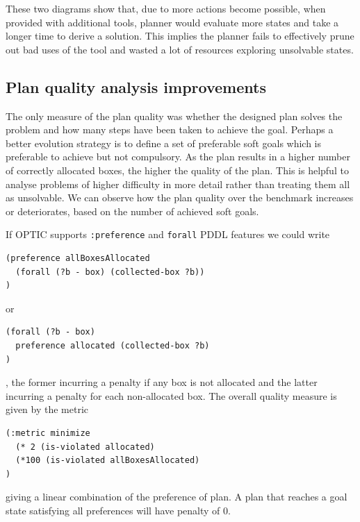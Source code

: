 \documentclass[letterpaper]{article} %
\begin{document}
These two diagrams show that, due to more actions become possible, 
when provided with additional tools, planner would evaluate more 
states and take a longer time to derive a solution. This implies 
the planner fails to effectively prune out bad uses of the tool and 
wasted a lot of resources exploring unsolvable states. 
\subsection{Plan quality analysis improvements}
The only measure of the plan quality was whether 
the designed plan solves the problem and how many 
steps have been taken to achieve the goal. Perhaps a better 
evolution strategy is to define a set of preferable 
soft goals which is preferable to achieve but not 
compulsory. As the plan results in a higher number 
of correctly allocated boxes, the higher the quality 
of the plan.  This is helpful to analyse problems 
of higher difficulty in more detail rather than 
treating them all as unsolvable. We can observe 
how the plan quality over the benchmark increases 
or deteriorates, based on the number of achieved 
soft goals.  

If OPTIC supports \texttt{:preference} and \texttt{forall}
PDDL features we could write 
\begin{verbatim}
(preference allBoxesAllocated 
  (forall (?b - box) (collected-box ?b))
)  
\end{verbatim}
or 
\begin{verbatim}
(forall (?b - box) 
  preference allocated (collected-box ?b)
)
\end{verbatim}
, the former incurring a penalty if any box is
 not allocated and the latter incurring a 
 penalty for each non-allocated box. 
 The overall quality measure is given by the metric
\begin{verbatim}
(:metric minimize 
  (* 2 (is-violated allocated)
  (*100 (is-violated allBoxesAllocated)
)
\end{verbatim}
 giving a linear combination of the preference of plan. 
 A plan that reaches a goal state satisfying 
 all preferences will have penalty of 0.



\end{document}

